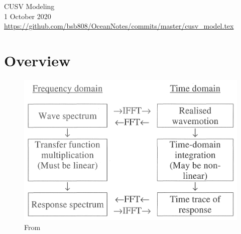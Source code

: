 \documentclass[11pt, letterpaper]{article}
\newcommand{\doctitle}{CUSV Modeling}
\newif\ifoverleaf %
\begin{document}

\newcommand{\SF}{0.2}
\newcommand{\SFb}{0.45}
\newcommand{\SFPic}{0.45}
\newcommand{\SFPlot}{0.45}
\newcommand{\SFc}{0.25}
\newcommand{\FigWidth}{\SFb}

\newpage
\begin{center}
{\huge \doctitle} \\
{\Large 1 October 2020} \\
\url{https://github.com/bsb808/OceanNotes/commits/master/cusv_model.tex}
\end{center}

\section{Overview}

\begin{figure}[hbt!]
\centering
\includegraphics[width=0.6\linewidth]{images/bergdahl_roads.png}
\caption{From \cite{bergdahl09wave}}
\label{f:wave}
\end{figure}
\end{document}
